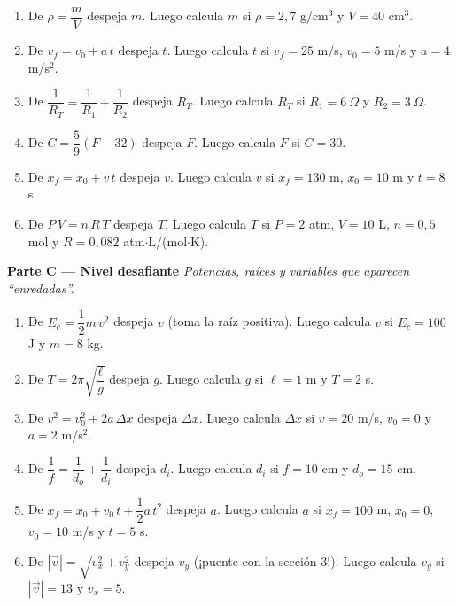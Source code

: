 \documentclass[12pt, letterpaper]{article}
\begin{document}
\begin{enumerate}[leftmargin=*, resume]
  \item \medio{} De $\rho = \dfrac{m}{V}$ despeja $m$. Luego calcula $m$ si $\rho = 2{,}7$ g/cm$^3$ y $V = 40$ cm$^3$.

  \item \medio{} De $v_f = v_0 + a\,t$ despeja $t$. Luego calcula $t$ si $v_f = 25$ m/s, $v_0 = 5$ m/s y $a = 4$ m/s$^2$.

  \item \medio{} De $\dfrac{1}{R_T} = \dfrac{1}{R_1} + \dfrac{1}{R_2}$ despeja $R_T$. Luego calcula $R_T$ si $R_1 = 6\ \Omega$ y $R_2 = 3\ \Omega$.

  \item \medio{} De $C = \dfrac{5}{9}(F - 32)$ despeja $F$. Luego calcula $F$ si $C = 30$.

  \item \medio{} De $x_f = x_0 + v\,t$ despeja $v$. Luego calcula $v$ si $x_f = 130$ m, $x_0 = 10$ m y $t = 8$ s.

  \item \medio{} De $P\,V = n\,R\,T$ despeja $T$. Luego calcula $T$ si $P = 2$ atm, $V = 10$ L, $n = 0{,}5$ mol y $R = 0{,}082$ atm$\cdot$L/(mol$\cdot$K).
\end{enumerate}

\medskip
\noindent\textbf{Parte C --- Nivel desafiante \dificil}\quad \emph{Potencias, raíces y variables que aparecen ``enredadas''.}

\begin{enumerate}[leftmargin=*, resume]
  \item \dificil{} De $E_c = \dfrac{1}{2}m\,v^2$ despeja $v$ (toma la raíz positiva). Luego calcula $v$ si $E_c = 100$ J y $m = 8$ kg.

  \item \dificil{} De $T = 2\pi\sqrt{\dfrac{\ell}{g}}$ despeja $g$. Luego calcula $g$ si $\ell = 1$ m y $T = 2$ s.

  \item \dificil{} De $v^2 = v_0^2 + 2a\,\Delta x$ despeja $\Delta x$. Luego calcula $\Delta x$ si $v = 20$ m/s, $v_0 = 0$ y $a = 2$ m/s$^2$.

  \item \dificil{} De $\dfrac{1}{f} = \dfrac{1}{d_o} + \dfrac{1}{d_i}$ despeja $d_i$. Luego calcula $d_i$ si $f = 10$ cm y $d_o = 15$ cm.

  \item \dificil{} De $x_f = x_0 + v_0\,t + \dfrac{1}{2}a\,t^2$ despeja $a$. Luego calcula $a$ si $x_f = 100$ m, $x_0 = 0$, $v_0 = 10$ m/s y $t = 5$ s.

  \item \dificil{} De $|\vec{v}| = \sqrt{v_x^2 + v_y^2}$ despeja $v_y$ (¡puente con la sección 3!). Luego calcula $v_y$ si $|\vec{v}| = 13$ y $v_x = 5$.
\end{enumerate}
\end{document}
